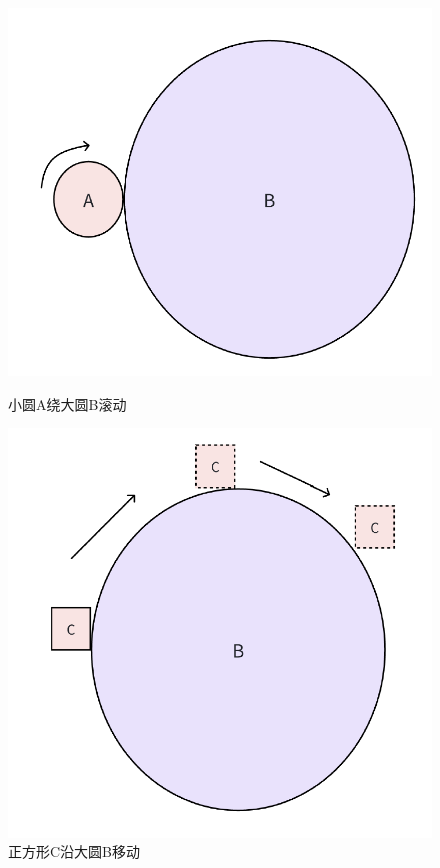 \documentclass[UTF8]{ctexart}
\begin{document}
\begin{figure}[h!]
    \centering
    \begin{minipage}{0.45\textwidth}
        \centering
        \includegraphics[width=0.8\linewidth]{Figure1.png} 
        \caption{小圆A绕大圆B滚动}
        \label{fig:fig1}
    \end{minipage}\hfill
    \begin{minipage}{0.45\textwidth}
        \centering
        \includegraphics[width=0.8\linewidth]{Figure2.png}
        \caption{正方形C沿大圆B移动}
        \label{fig:fig2}
    \end{minipage}
\end{figure}
\end{document}
